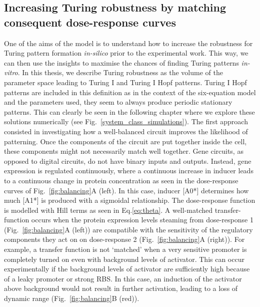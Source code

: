 \subsection{Increasing Turing robustness by matching consequent dose-response curves}\label{balancing}
One of the aims of the model is
to understand
how to increase the robustness for Turing pattern formation \textit{in-silico} prior to the experimental work.
This way, we can then use the insights to maximise the chances of finding Turing patterns \textit{in-vitro}.
In this thesis,
we describe Turing robustness as the volume of the parameter space leading to Turing I and Turing I Hopf patterns.
Turing I Hopf patterns are included in this definition as in the context of the six-equation model and the parameters used, they seem to always produce periodic stationary patterns.
This can clearly be seen in the following chapter where we explore these solutions numerically (see Fig.~\ref{system_class_simulations}).
The first approach consisted in investigating how a well-balanced circuit improves the likelihood of patterning.
Once the components of the circuit are put together inside the cell,
these components might not necessarily match well together.
Gene circuits, as opposed to digital circuits, do not have binary inputs and outputs.
Instead, gene expression is regulated continuously,
where a continuous increase in inducer leads to a continuous change in protein concentration
as seen in the dose-response curves of Fig.~\ref{fig:balancing}A
(left).
In this case, inducer [A0*] determines how much [A1*] is produced with a sigmoidal relationship.
The dose-response function is modelled with Hill terms as seen in Eq.\ref{eq:theta}.
A well-matched transfer-function occurs when the protein expression levels steaming from dose-response 1
(Fig.~\ref{fig:balancing}A (left))
are compatible with the sensitivity of the regulatory components they act on on dose-response 2
(Fig.~\ref{fig:balancing}A (right)).
For example, a transfer function is not ‘matched’
when a very sensitive promoter is completely turned on even with background levels of activator.
This can occur experimentally
if the background levels of activator are sufficiently high because of a leaky promoter or strong RBS.
In this case, an induction of the activator above background would not result in further activation,
leading to a loss of dynamic range (Fig.~\ref{fig:balancing}B (red)).


